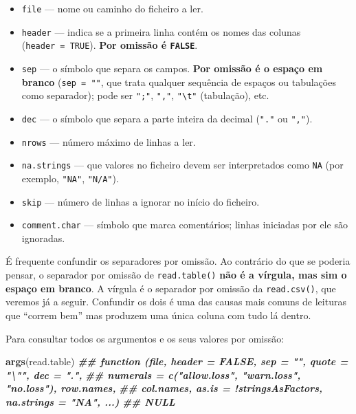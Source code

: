 \documentclass[
  portuguese,
  11pt,
  openany]{book}
\newenvironment{Shaded}{\begin{snugshade}}{\end{snugshade}}
\newcommand{\DocumentationTok}[1]{\textcolor[rgb]{0.56,0.35,0.01}{\textbf{\textit{#1}}}}
\newcommand{\FunctionTok}[1]{\textcolor[rgb]{0.13,0.29,0.53}{\textbf{#1}}}
\newcommand{\NormalTok}[1]{#1}
\providecommand{\tightlist}{%
  \setlength{\itemsep}{0pt}\setlength{\parskip}{0pt}}
\begin{document}
\begin{itemize}
\tightlist
\item
  \texttt{file} --- nome ou caminho do ficheiro a ler.
\item
  \texttt{header} --- indica se a primeira linha contém os nomes das colunas
  (\texttt{header\ =\ TRUE}). \textbf{Por omissão é \texttt{FALSE}}.
\item
  \texttt{sep} --- o símbolo que separa os campos. \textbf{Por omissão é o espaço em branco}
  (\texttt{sep\ =\ ""}, que trata qualquer sequência de espaços ou tabulações como
  separador); pode ser \texttt{";"}, \texttt{","}, \texttt{"\textbackslash{}t"} (tabulação), etc.
\item
  \texttt{dec} --- o símbolo que separa a parte inteira da decimal (\texttt{"."} ou \texttt{","}).
\item
  \texttt{nrows} --- número máximo de linhas a ler.
\item
  \texttt{na.strings} --- que valores no ficheiro devem ser interpretados como \texttt{NA} (por
  exemplo, \texttt{"NA"}, \texttt{"N/A"}).
\item
  \texttt{skip} --- número de linhas a ignorar no início do ficheiro.
\item
  \texttt{comment.char} --- símbolo que marca comentários; linhas iniciadas por ele são
  ignoradas.
\end{itemize}

É frequente confundir os separadores por omissão. Ao contrário do que se poderia
pensar, o separador por omissão de \texttt{read.table()} \textbf{não é a vírgula, mas sim o
espaço em branco}. A vírgula é o separador por omissão da \texttt{read.csv()}, que veremos
já a seguir. Confundir os dois é uma das causas mais comuns de leituras que ``correm
bem'' mas produzem uma única coluna com tudo lá dentro.

Para consultar todos os argumentos e os seus valores por omissão:

\begin{Shaded}
\begin{Highlighting}[]
\FunctionTok{args}\NormalTok{(read.table)}
\DocumentationTok{\#\# function (file, header = FALSE, sep = "", quote = "\textbackslash{}"\textquotesingle{}", dec = ".",}
\DocumentationTok{\#\#     numerals = c("allow.loss", "warn.loss", "no.loss"), row.names,}
\DocumentationTok{\#\#     col.names, as.is = !stringsAsFactors, na.strings = "NA", ...)}
\DocumentationTok{\#\# NULL}
\end{Highlighting}
\end{Shaded}
\end{document}
